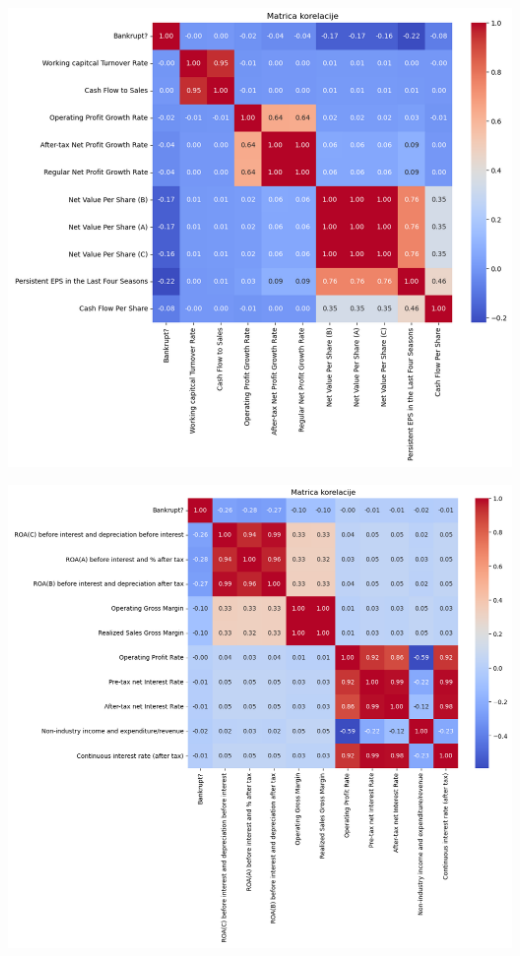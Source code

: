 \documentclass[12pt]{article}
\theoremstyle{definition}
\theoremstyle{remark}
\begin{document}
\noindent\begin{minipage}{0.5\linewidth}
    \centering
    \includegraphics[width=1\linewidth]{slika1.png}\newline
    
\end{minipage}
\begin{minipage}{0.5\linewidth}
    \centering
    \includegraphics[width=1\linewidth]{slika3.png}\newline
     
\end{minipage}
\end{document}
